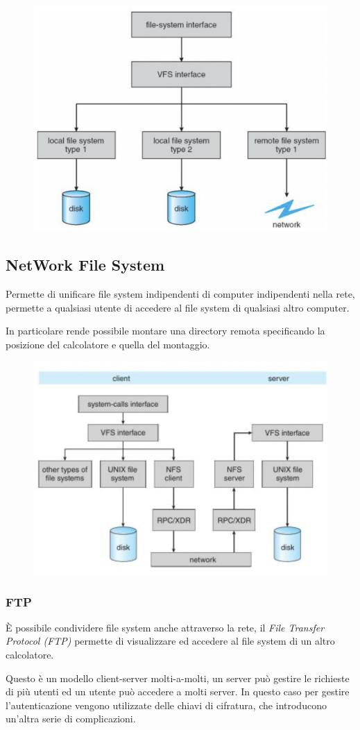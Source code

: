 \begin{figure}[H]
    \centering
    \includegraphics[width=0.5\linewidth]{assets/virtual-file-system.png}
\end{figure}

\subsection{NetWork File System}
Permette di unificare file system indipendenti di computer indipendenti nella rete, permette a qualsiasi utente di accedere al file system di qualsiasi altro computer.

In particolare rende possibile montare una directory remota specificando la posizione del calcolatore e quella del montaggio.

\begin{figure}[H]
    \centering
    \includegraphics[width=0.5\linewidth]{assets/NFS.png}
\end{figure}

\subsubsection{FTP}
È possibile condividere file system anche attraverso la rete, il \textit{File Transfer Protocol (FTP)} permette di visualizzare ed accedere al file system di un altro calcolatore.

Questo è un modello client-server molti-a-molti, un server può gestire le richieste di più utenti ed un utente può accedere a molti server.
In questo caso per gestire l'autenticazione vengono utilizzate delle chiavi di cifratura, che introducono un'altra serie di complicazioni.

